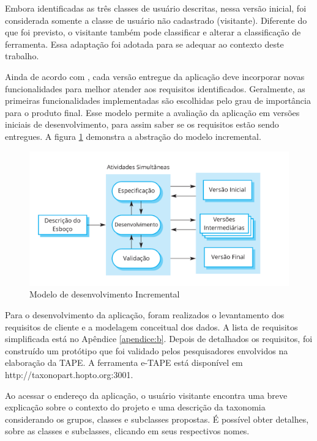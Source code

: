 \par
Embora identificadas as três classes de usuário descritas, nessa versão inicial, foi considerada somente a classe de usuário não cadastrado (visitante).
Diferente do que foi previsto, o visitante também pode classificar e alterar a classificação de ferramenta. Essa adaptação foi adotada para se adequar ao contexto deste trabalho. 

\par
Ainda de acordo com , cada versão entregue da aplicação deve incorporar novas funcionalidades para melhor atender aos requisitos identificados. Geralmente, as primeiras funcionalidades implementadas são escolhidas pelo grau de importância para o produto final. Esse modelo permite a avaliação da aplicação em versões iniciais de desenvolvimento, para assim saber 
se os requisitos estão sendo entregues. A figura \ref{fig:modelo-incremental} demonstra a abstração do modelo incremental.

\begin{figure}[!ht]
    \centering
    \includegraphics[scale=0.20]{./figuras/modelo_incremental.png}
    \caption{Modelo de desenvolvimento Incremental }
    \label{fig:modelo-incremental}
\end{figure}

\par
Para o desenvolvimento da aplicação, foram realizados o levantamento dos requisitos de cliente e a modelagem conceitual dos dados. A lista de requisitos simplificada está no Apêndice \ref{apendice:b}. 
Depois de detalhados os requisitos, foi construído um protótipo que foi validado pelos pesquisadores envolvidos na elaboração da TAPE. A ferramenta e-TAPE está disponível em http://taxonopart.hopto.org:3001.

\par
Ao acessar o endereço da aplicação, o usuário visitante encontra uma breve explicação sobre o contexto do projeto e uma descrição da taxonomia considerando os grupos,
classes e subclasses propostas. É possível obter detalhes, sobre as classes e subclasses, clicando em seus respectivos nomes. 

